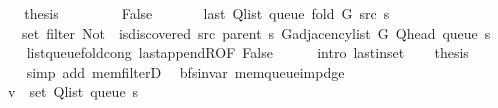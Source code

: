 \begin{isabellebody}
\ \ \isamarkupfalse%
\ \isamarkupfalse%
\ {\isacharquery}{\kern0pt}thesis\isanewline
\ \ \ \ \isacommand{{\isachardot}{\kern0pt}}\isamarkupfalse%
\isanewline
{}\isamarkupfalse%
\isanewline
\ \ \isamarkupfalse%
\ False\isanewline
\ \ \isamarkupfalse%
\isanewline
\ \ \ \ {\isachardoublequoteopen}last\ {\isacharparenleft}{\kern0pt}Q{\isacharunderscore}{\kern0pt}list\ {\isacharparenleft}{\kern0pt}queue\ {\isacharparenleft}{\kern0pt}fold\ G\ src\ s{\isacharparenright}{\kern0pt}{\isacharparenright}{\kern0pt}{\isacharparenright}{\kern0pt}\ {\isasymin}\isanewline
\ \ \ \ \ set\ {\isacharparenleft}{\kern0pt}filter\ {\isacharparenleft}{\kern0pt}Not\ {\isasymcirc}\ is{\isacharunderscore}{\kern0pt}discovered\ src\ {\isacharparenleft}{\kern0pt}parent\ s{\isacharparenright}{\kern0pt}{\isacharparenright}{\kern0pt}\ {\isacharparenleft}{\kern0pt}G{\isachardot}{\kern0pt}adjacency{\isacharunderscore}{\kern0pt}list\ G\ {\isacharparenleft}{\kern0pt}Q{\isacharunderscore}{\kern0pt}head\ {\isacharparenleft}{\kern0pt}queue\ s{\isacharparenright}{\kern0pt}{\isacharparenright}{\kern0pt}{\isacharparenright}{\kern0pt}{\isacharparenright}{\kern0pt}{\isachardoublequoteclose}\isanewline
\ \ \ \ \isamarkupfalse%
\ list{\isacharunderscore}{\kern0pt}queue{\isacharunderscore}{\kern0pt}fold{\isacharunderscore}{\kern0pt}cong\ last{\isacharunderscore}{\kern0pt}appendR{\isacharbrackleft}{\kern0pt}OF\ False{\isacharbrackright}{\kern0pt}\isanewline
\ \ \ \ \isamarkupfalse%
\ {\isacharparenleft}{\kern0pt}intro\ last{\isacharunderscore}{\kern0pt}in{\isacharunderscore}{\kern0pt}set{\isacharparenright}{\kern0pt}\isanewline
\ \ \isamarkupfalse%
\ {\isacharquery}{\kern0pt}thesis\isanewline
\ \ \ \ \isamarkupfalse%
\ {\isacharparenleft}{\kern0pt}simp\ add{\isacharcolon}{\kern0pt}\ mem{\isacharunderscore}{\kern0pt}filterD{\isacharparenleft}{\kern0pt}{}{\isacharparenright}{\kern0pt}{\isacharparenright}{\kern0pt}\isanewline
{}\isamarkupfalse%
%
\endisatagproof
{\isafoldproof}%
%
\isadelimproof
\isanewline
%
\endisadelimproof
%
\isadeliminvisible
\isanewline
%
\endisadeliminvisible
%
\isataginvisible
{}\isamarkupfalse%
\ {\isacharparenleft}{\kern0pt}\ bfs{\isacharunderscore}{\kern0pt}invar{\isacharparenright}{\kern0pt}\ mem{\isacharunderscore}{\kern0pt}queue{\isacharunderscore}{\kern0pt}imp{\isacharunderscore}{\kern0pt}d{\isacharunderscore}{\kern0pt}ge{\isacharcolon}{\kern0pt}\isanewline
\ \ \ {\isachardoublequoteopen}v\ {\isasymin}\ set\ {\isacharparenleft}{\kern0pt}Q{\isacharunderscore}{\kern0pt}list\ {\isacharparenleft}{\kern0pt}queue\ s{\isacharparenright}{\kern0pt}{\isacharparenright}{\kern0pt}{\isachardoublequoteclose}\isanewline

\end{isabellebody}
